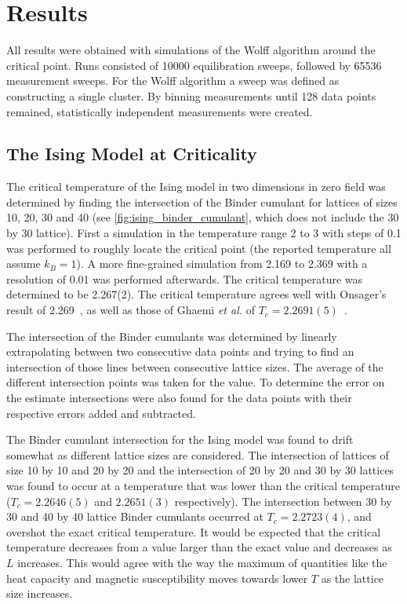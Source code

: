 \documentclass[11pt, a4paper]{report} %
\begin{document}
\chapter{Results}

All results were obtained with simulations of the Wolff algorithm around the critical point.
Runs consisted of 10000 equilibration sweeps, followed by 65536 measurement sweeps.
For the Wolff algorithm a sweep was defined as constructing a single cluster.
By binning measurements until 128 data points remained, statistically independent measurements were created.

\section{The Ising Model at Criticality}

The critical temperature of the Ising model in two dimensions in zero field was determined by finding the intersection of the Binder cumulant for lattices of sizes 10, 20, 30 and 40 (see \cref{fig:ising_binder_cumulant}, which does not include the 30 by 30 lattice).
First a simulation in the temperature range 2 to 3 with steps of 0.1 was performed to roughly locate the critical point (the reported temperature all assume \(k_B = 1\)).
A more fine-grained simulation from 2.169 to 2.369 with a resolution of 0.01 was performed afterwards.
The critical temperature was determined to be 2.267(2).
The critical temperature agrees well with Onsager's result of 2.269~\cite{onsager:1944}, as well as those of Ghaemi \textit{et al.} of \(T_c = 2.2691(5)\)~\cite{ghaemi:2001}.

The intersection of the Binder cumulants was determined by linearly extrapolating between two consecutive data points and trying to find an intersection of those lines between consecutive lattice sizes.
The average of the different intersection points was taken for the value.
To determine the error on the estimate intersections were also found for the data points with their respective errors added and subtracted.

The Binder cumulant intersection for the Ising model was found to drift somewhat as different lattice sizes are considered.
The intersection of lattices of size 10 by 10 and 20 by 20 and the intersection of 20 by 20 and 30 by 30 lattices was found to occur at a temperature that was lower than the critical temperature (\(T_c = 2.2646(5)\) and \(2.2651(3)\) respectively).
The intersection between 30 by 30 and 40 by 40 lattice Binder cumulants occurred at \( T_c = 2.2723(4)\), and overshot the exact critical temperature.
It would be expected that the critical temperature decreases from a value larger than the exact value and decreases as \(L\) increases.
This would agree with the way the maximum of quantities like the heat capacity and magnetic susceptibility moves towards lower \(T\) as the lattice size increases.
\end{document}
